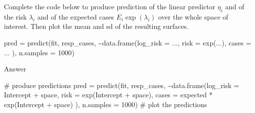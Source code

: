 \documentclass[
  letterpaper,
  DIV=11,
  numbers=noendperiod]{scrartcl}
\newenvironment{Shaded}{\begin{snugshade}}{\end{snugshade}}
\newcommand{\AttributeTok}[1]{\textcolor[rgb]{0.40,0.45,0.13}{#1}}
\newcommand{\CommentTok}[1]{\textcolor[rgb]{0.37,0.37,0.37}{#1}}
\newcommand{\DecValTok}[1]{\textcolor[rgb]{0.68,0.00,0.00}{#1}}
\newcommand{\FunctionTok}[1]{\textcolor[rgb]{0.28,0.35,0.67}{#1}}
\newcommand{\NormalTok}[1]{\textcolor[rgb]{0.00,0.23,0.31}{#1}}
\newcommand{\OtherTok}[1]{\textcolor[rgb]{0.00,0.23,0.31}{#1}}
\newcommand{\SpecialCharTok}[1]{\textcolor[rgb]{0.37,0.37,0.37}{#1}}
\begin{document}
\begin{tcolorbox}[enhanced jigsaw, title={Question}, bottomtitle=1mm, arc=.35mm, titlerule=0mm, opacityback=0, rightrule=.15mm, breakable, colback=white, colbacktitle=quarto-callout-tip-color!10!white, bottomrule=.15mm, coltitle=black, left=2mm, colframe=quarto-callout-tip-color-frame, toptitle=1mm, toprule=.15mm, opacitybacktitle=0.6, leftrule=.75mm]

Complete the code below to produce prediction of the linear predictor
\(\eta_i\) and of the risk \(\lambda_i\) and of the expected cases
\(E_i\exp(\lambda_i)\) over the whole space of interest. Then plot the
mean and sd of the resulting surfaces.

\begin{Shaded}
\begin{Highlighting}[]
\NormalTok{pred }\OtherTok{=} \FunctionTok{predict}\NormalTok{(fit, resp\_cases, }\SpecialCharTok{\textasciitilde{}}\FunctionTok{data.frame}\NormalTok{(}\AttributeTok{log\_risk =}\NormalTok{ ...,}
                                             \AttributeTok{risk =} \FunctionTok{exp}\NormalTok{(...),}
                                             \AttributeTok{cases =}\NormalTok{ ...}
\NormalTok{                                             ),}
               \AttributeTok{n.samples =} \DecValTok{1000}\NormalTok{)}
\end{Highlighting}
\end{Shaded}

Answer

\begin{Shaded}
\begin{Highlighting}[]
\CommentTok{\# produce predictions}
\NormalTok{pred }\OtherTok{=} \FunctionTok{predict}\NormalTok{(fit, resp\_cases, }\SpecialCharTok{\textasciitilde{}}\FunctionTok{data.frame}\NormalTok{(}\AttributeTok{log\_risk =}\NormalTok{ Intercept }\SpecialCharTok{+}\NormalTok{ space,}
                                             \AttributeTok{risk =} \FunctionTok{exp}\NormalTok{(Intercept }\SpecialCharTok{+}\NormalTok{ space),}
                                             \AttributeTok{cases =}\NormalTok{ expected }\SpecialCharTok{*} \FunctionTok{exp}\NormalTok{(Intercept }\SpecialCharTok{+}\NormalTok{ space)}
\NormalTok{                                             ),}
               \AttributeTok{n.samples =} \DecValTok{1000}\NormalTok{)}
\CommentTok{\# plot the predictions}


\end{Highlighting}
\end{Shaded}
\end{tcolorbox}
\end{document}
